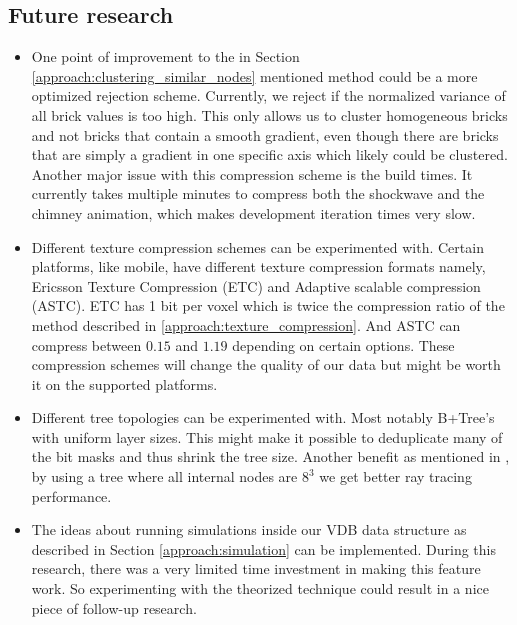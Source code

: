 \newpage
\subsection{Future research} \label{conclusion:future_research}

\begin{itemize}
    \item One point of improvement to the in Section \ref{approach:clustering_similar_nodes} mentioned method could be a more optimized rejection scheme. Currently, we reject if the normalized variance of all brick values is too high. This only allows us to cluster homogeneous bricks and not bricks that contain a smooth gradient, even though there are bricks that are simply a gradient in one specific axis which likely could be clustered. Another major issue with this compression scheme is the build times. It currently takes multiple minutes to compress both the shockwave and the chimney animation, which makes development iteration times very slow.
    \item Different texture compression schemes can be experimented with. Certain platforms, like mobile, have different texture compression formats namely, Ericsson Texture Compression (ETC) and Adaptive scalable compression (ASTC). ETC has 1 bit per voxel which is twice the compression ratio of the method described in \ref{approach:texture_compression}. And ASTC can compress between $0.15$ and $1.19$ depending on certain options. These compression schemes will change the quality of our data but might be worth it on the supported platforms.
    \item Different tree topologies can be experimented with. Most notably B+Tree's with uniform layer sizes. This might make it possible to deduplicate many of the bit masks and thus shrink the tree size. Another benefit as mentioned in \cite{hoetzlein2016gvdb}, by using a tree where all internal nodes are $8^3$ we get better ray tracing performance.
    \item The ideas about running simulations inside our VDB data structure as described in Section \ref{approach:simulation} can be implemented. During this research, there was a very limited time investment in making this feature work. So experimenting with the theorized technique could result in a nice piece of follow-up research.
\end{itemize}

